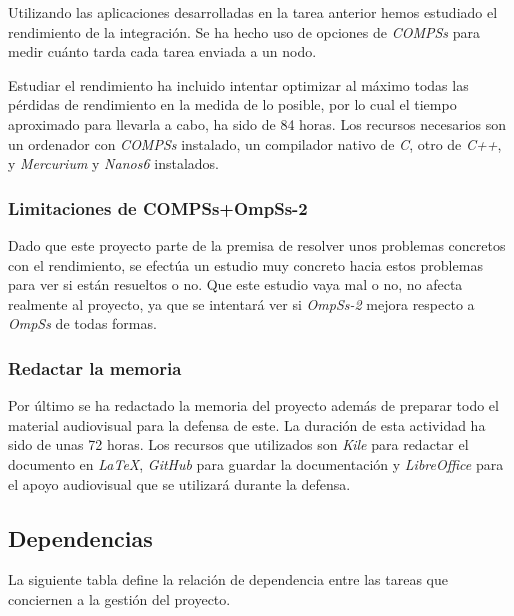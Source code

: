 Utilizando las aplicaciones desarrolladas en la tarea anterior hemos estudiado el rendimiento de la integración. Se ha hecho uso de opciones de \textit{COMPSs} para medir cuánto tarda cada tarea enviada a un nodo. 
\par\bigskip

Estudiar el rendimiento ha incluido intentar optimizar al máximo todas las pérdidas de rendimiento en la medida de lo posible, por lo cual el tiempo aproximado para llevarla a cabo, ha sido de 84 horas. Los recursos necesarios son un ordenador con \textit{COMPSs} instalado, un compilador nativo de \textit{C}, otro de \textit{C++}, y \textit{Mercurium} y \textit{Nanos6} instalados.

\subsubsection{Limitaciones de COMPSs+OmpSs-2}

Dado que este proyecto parte de la premisa de resolver unos problemas concretos con el rendimiento, se efectúa un estudio muy concreto hacia estos problemas para ver si están resueltos o no. Que este estudio vaya mal o no, no afecta realmente al proyecto, ya que se intentará ver si \textit{OmpSs-2} mejora respecto a \textit{OmpSs} de todas formas.

\subsubsection{Redactar la memoria}

Por último se ha redactado la memoria del proyecto además de preparar todo el material audiovisual para la defensa de este. La duración de esta actividad ha sido de unas 72 horas. Los recursos que utilizados son \textit{Kile} para redactar el documento en \textit{LaTeX}, \textit{GitHub} para guardar la documentación y \textit{LibreOffice} para el apoyo audiovisual que se utilizará durante la defensa.

\subsection{Dependencias}

La siguiente tabla define la relación de dependencia entre las tareas que conciernen a la gestión del proyecto.

